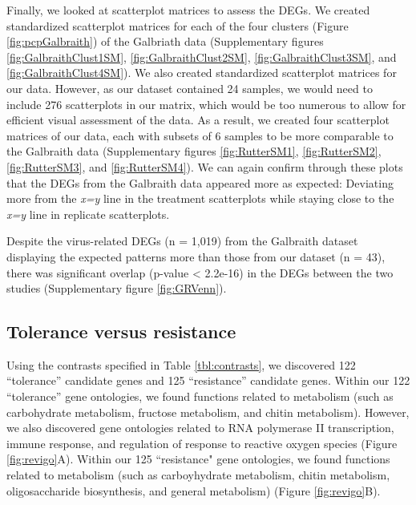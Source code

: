 \documentclass[11pt,a4paper,oldfontcommands,openany]{memoir}
\numberwithin{equation}{section} %
\begin{document}
Finally, we looked at scatterplot matrices to assess the DEGs. We created standardized scatterplot matrices for each of the four clusters (Figure \ref{fig:pcpGalbraith}) of the Galbriath data (Supplementary figures \ref{fig:GalbraithClust1SM}, \ref{fig:GalbraithClust2SM}, \ref{fig:GalbraithClust3SM}, and \ref{fig:GalbraithClust4SM}). We also created standardized scatterplot matrices for our data. However, as our dataset contained 24 samples, we would need to include 276 scatterplots in our matrix, which would be too numerous to allow for efficient visual assessment of the data. As a result, we created four scatterplot matrices of our data, each with subsets of 6 samples to be more comparable to the Galbraith data (Supplementary figures \ref{fig:RutterSM1}, \ref{fig:RutterSM2}, \ref{fig:RutterSM3}, and \ref{fig:RutterSM4}). We can again confirm through these plots that the DEGs from the Galbraith data appeared more as expected: Deviating more from the \textit{x=y} line in the treatment scatterplots while staying close to the \textit{x=y} line in replicate scatterplots.

Despite the virus-related DEGs (n = 1,019) from the Galbraith dataset displaying the expected patterns more than those from our dataset (n = 43), there was significant overlap (p-value < 2.2e-16) in the DEGs between the two studies (Supplementary figure \ref{fig:GRVenn}).

\subsection{Tolerance versus resistance}

Using the contrasts specified in Table \ref{tbl:contrasts}, we discovered 122 ``tolerance'' candidate genes and 125 ``resistance'' candidate genes. Within our 122 ``tolerance'' gene ontologies, we found functions related to metabolism (such as carbohydrate metabolism, fructose metabolism, and chitin metabolism). However, we also discovered gene ontologies related to RNA polymerase II transcription, immune response, and regulation of response to reactive oxygen species (Figure \ref{fig:revigo}A). Within our 125 ``resistance" gene ontologies, we found functions related to metabolism (such as carboyhydrate metabolism, chitin metabolism, oligosaccharide biosynthesis, and general metabolism) (Figure \ref{fig:revigo}B). 
\end{document}
